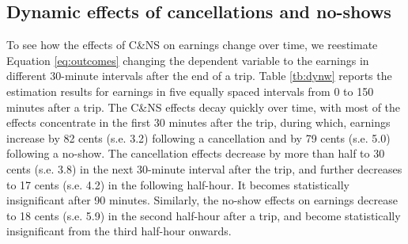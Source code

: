 \documentclass[reviewmode]{restat}
\begin{document}




\subsection{Dynamic effects of cancellations and no-shows}
To see how the effects of C\&NS on earnings change over time, we reestimate Equation \eqref{eq:outcomes} changing the dependent variable to the earnings in different 30-minute intervals after the end of a trip. Table \ref{tb:dynw} reports the estimation results for earnings in five equally spaced intervals from 0 to 150 minutes after a trip. The C\&NS effects decay quickly over time, with most of the effects concentrate in the first 30 minutes after the trip, during which, earnings increase by 82 cents (s.e. 3.2) following a cancellation and by 79 cents (s.e. 5.0) following a no-show. The cancellation effects decrease by more than half to 30 cents (s.e. 3.8) in the next 30-minute interval after the trip, and further decreases to 17 cents (s.e. 4.2) in the following half-hour. It becomes statistically insignificant after 90 minutes. Similarly, the no-show effects on earnings decrease to 18 cents (s.e. 5.9) in the second half-hour after a trip, and become statistically insignificant from the third half-hour onwards.
\end{document}
